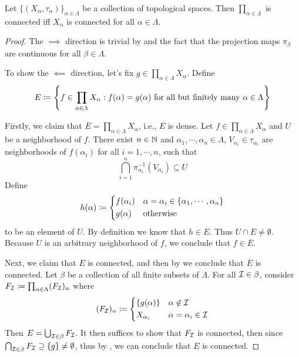 \documentclass{techreport}
\begin{document}
\begin{theorem}\label{The:ProdConnIffEachConn}
	Let $\{(X_\alpha,\tau_\alpha)\}_{\alpha \in \Lambda}$ be a collection of topological spaces.
	Then $\prod_{\alpha \in \Lambda}$ is connected iff $X_\alpha$ is connected for all $\alpha \in \Lambda$.
\end{theorem}
\begin{proof}
	The $\implies$ direction is trivial by  and the fact that the projection maps $\pi_\beta$ are continuous for all $\beta \in \Lambda$.
	
	To show the $\impliedby$ direction, let's fix $g \in \prod_{\alpha \in \Lambda} X_\alpha$. Define
	\[
	E \coloneqq \left\{ { f \in \prod_{\alpha \in \Lambda} X_\alpha : f(\alpha)=g(\alpha)~\text{for all but finitely many $\alpha \in \Lambda$} } \right\}
	\]
	
	Firstly, we claim that $\overline{E} = \prod_{\alpha \in \Lambda} X_\alpha$, i.e., $E$ is dense.
	Let $f \in \prod_{\alpha \in \Lambda} X_\alpha$ and $U$ be a neighborhood of $f$.
	There exist $n \in \mathbb{N}$ and $\alpha_1,\cdots,\alpha_n \in \Lambda$, $V_{\alpha_i} \in \tau_{\alpha_i}$ are neighborhoods of $f(\alpha_i)$ for all $i=1,\cdots,n$, such that
	\[
	\bigcap_{i=1}^n \pi_{\alpha_i}^{-1}(V_{\alpha_i}) \subseteq U
	\]
	Define
	\[
	h(\alpha) \coloneqq \begin{dcases}
 		f(\alpha_i) & \alpha=\alpha_i  \in \{ \alpha_1,\cdots, \alpha_n \} \\
 		g(\alpha) & \text{otherwise}
 	\end{dcases}
	\]
	to be an element of $U$.
	By definition we know that $h \in E$.
	Thus $U \cap E \neq \emptyset$.
	Because $U$ is an arbitrary neighborhood of $f$, we conclude that $f \in \overline{E}$.
	
	Next, we claim that $E$ is connected, and then by  we conclude that $\overline{E}$ is connected.
	Let $\beta$ be a collection of all finite subsets of $\Lambda$.
	For all $\mathcal{I} \in \beta$, consider $F_{\mathcal{I}} \coloneqq \prod_{\alpha \in \Lambda} (F_{\mathcal{I}})_\alpha$ where
	\[
	(F_{\mathcal{I}})_\alpha \coloneqq \begin{dcases}
 		\{ g(\alpha)\} & \alpha \not\in \mathcal{I} \\
 		X_{\alpha_i} & \alpha=\alpha_i \in \mathcal{I}
 	\end{dcases}
	\]
	Then $E = \bigcup_{\mathcal{I} \in \beta} F_{\mathcal{I}}$.
	It then suffices to show that $F_{\mathcal{I}}$ is connected, then since $\bigcap_{\mathcal{I} \in \beta} F_{\mathcal{I}} \supseteq \{g\} \neq \emptyset$, thus by , we can conclude that $E$ is connected.
	

\end{proof}
\end{document}
